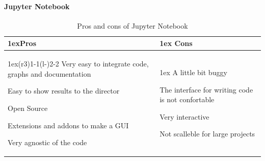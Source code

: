 \documentclass{article}
\begin{document}
    \paragraph{Jupyter Notebook}
    \begin{table}[H]
    \begin{tabularx}{\linewidth}{>{\parskip1ex}X@{\kern4\tabcolsep}>{\parskip1ex}X}
    \toprule
    \hfil\bfseries Pros
    &
    \hfil\bfseries Cons
    \\\cmidrule(r{3\tabcolsep}){1-1}\cmidrule(l{-\tabcolsep}){2-2}
    Very easy to integrate code, graphs and documentation\par
    Easy to show results to the director\par
    Open Source\par
    Extensions and addons to make a GUI\par
    Very agnostic of the code\par
    &
    A little bit buggy\par
    The interface for writing code is not confortable\par
    Very interactive\par
    Not scalleble for large projects\par
    \\\bottomrule
    \end{tabularx}
    \caption{Pros and cons of Jupyter Notebook}
    \end{table}
\end{document}
